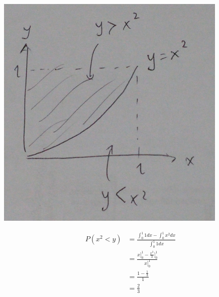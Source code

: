 \documentclass[9pt]{article}
\begin{document}
\begin{center}
  \includegraphics[scale=0.4]{q3a.jpg}
\end{center}

\begin{align*}
  P(x^2 < y) &= \frac{\int_0^1 1 dx - \int_0^1 x^2 dx}{\int_0^1 1 dx} \\
  &= \frac{x \bigg]_0^1 - \frac{x^3}{3}\bigg]_0^1}{x \bigg]_0^1} \\
  &= \frac{1 - \frac{1}{3}}{1} \\
  &= \frac{2}{3}
\end{align*}
\end{document}
